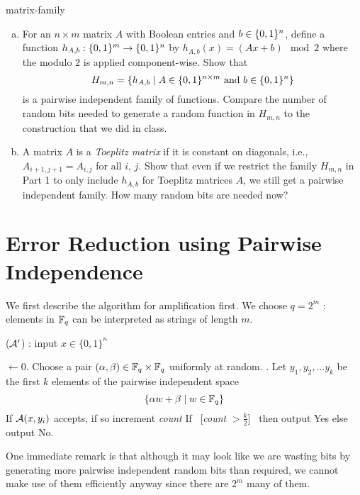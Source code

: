 \begin{exercise-prob}
\begin{show-ps2}{matrix-family}
\begin{enumerate}[(a)]
\item For an $n \times m$ matrix $A$ with Boolean entries and
$b \in \{0,1\}^n$, define a function $h_{A,b} : \{0,1\}^m \to \{0,1\}^n$ by
$h_{A,b}(x)= (Ax + b) \mod 2$ where the modulo 2 is applied component-wise. Show that 
$$H_{m,n} = \{h_{A,b} \mid A \in \{0,1\}^{n \times m} \textrm{ and } b \in \{0,1\}^n\}$$
is a pairwise independent family of functions. Compare the number of random bits needed to generate a random function in $H_{m,n}$ to the construction that we did in class.
\item A matrix $A$ is a {\em Toeplitz matrix} if it is constant on
diagonals, i.e., $A_{i+1,j+1} = A_{i,j}$ for all $i$, $j$. Show that even if we restrict the family $H_{m,n}$ in Part 1 to only include $h_{A,b}$ for Toeplitz matrices $A$, we still get a pairwise independent family. How many random bits are needed now?
\end{enumerate}
\end{show-ps2}
\end{exercise-prob}

\section{Error Reduction using Pairwise Independence}
We first describe the algorithm for amplification first. We choose $q = 2^m$ : elements in ${\mathbb{F}}_q$ can be interpreted as strings of length $m$.

\begin{algorithm}
\label{alg:pairwise-indep-amplification}
\caption{(${\cal{A}'}$) : input $x \in \{0,1\}^n$} 
\begin{algorithmic}[1]
 $\gets 0$. 
\State Choose a pair $(\alpha,\beta) \in {\mathbb{F}}_q \times {\mathbb{F}}_q$ uniformly at random. . 
\State Let $y_1, y_2, \ldots y_k$ be the first $k$ elements of the pairwise independent space 
\vspace{-3mm}
$$\{ \alpha w + \beta \mid w \in {\mathbb{F}}_q \}$$
\vspace{-10mm}
	\State If ${\cal{A}}(x,y_i)$ accepts, if so increment {\em count}
\EndFor
\State If ~[{\em count} $> \frac{k}{2}$]~ then output {\sc Yes} else output {\sc No}.
\end{algorithmic}
\end{algorithm}
One immediate remark is that although it may look like we are wasting bits by generating more pairwise independent random bits than required, we cannot make use of them efficiently anyway since there are $2^m$ many of them.

